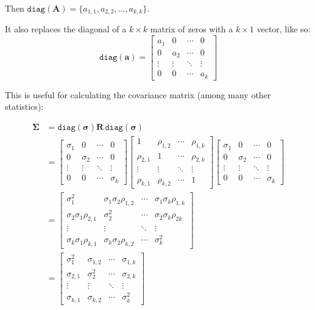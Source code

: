 \documentclass[nohyper,justified,marginals=raggedright]{tufte-book}\usepackage[]{graphicx}\usepackage[]{color}
\newcommand{\bs}[1]{\boldsymbol{#1}}
\begin{document}
\noindent Then $\mathtt{diag}(\bs{A}) = \{a_{1,1},a_{2,2},...,a_{k,k}\}$.

\noindent It also replaces the diagonal of a $k \times k$ matrix of zeros with a $k \times 1$ vector, like so:
\[
\mathtt{diag}(\bs{a}) = 
\begin{bmatrix}
  a_{1} & 0 & \cdots & 0 \\
  0 & a_{2} & \cdots & 0 \\
  \vdots  & \vdots  & \ddots & \vdots  \\
  0 & 0 & \cdots & a_{k}
 \end{bmatrix}
\]

\noindent This is useful for calculating the covariance matrix (among many other statistics):

\begin{align*}
\bs{\Sigma}&=\mathtt{diag}(\bs{\sigma}) \bs{R}\, \mathtt{diag}(\bs{\sigma})\\ 
&=\begin{bmatrix}
  \sigma_{1} & 0 & \cdots & 0 \\
  0 & \sigma_{2} & \cdots & 0 \\
  \vdots  & \vdots  & \ddots & \vdots  \\
  0 & 0 & \cdots & \sigma_{k}
 \end{bmatrix}
  \begin{bmatrix}
  1 & \rho_{1,2} & \cdots & \rho_{1,k} \\
  \rho_{2,1} & 1 & \cdots & \rho_{2,k} \\
  \vdots  & \vdots  & \ddots & \vdots  \\
  \rho_{k,1} & \rho_{k,2} & \cdots & 1
 \end{bmatrix}
\begin{bmatrix}
  \sigma_{1} & 0 & \cdots & 0 \\
  0 & \sigma_{2} & \cdots & 0 \\
  \vdots  & \vdots  & \ddots & \vdots  \\
  0 & 0 & \cdots & \sigma_{k}
 \end{bmatrix}\\
  &=  \begin{bmatrix}
  \sigma_{1}^2 & \sigma_{1}\sigma_{2}\rho_{1,2} & \cdots & \sigma_{1}\sigma_{k}\rho_{1,k} \\
  \sigma_{2}\sigma_{1}\rho_{2,1} & \sigma_{2}^2 & \cdots & \sigma_{2}\sigma_{k}\rho_{2 k} \\
  \vdots  & \vdots  & \ddots & \vdots  \\
  \sigma_{k}\sigma_{1}\rho_{k,1} & \sigma_{k}\sigma_{2}\rho_{k,2} & \cdots & \sigma_{k}^2
 \end{bmatrix}\\
   &=  \begin{bmatrix}
  \sigma_{1}^2 & \sigma_{1,2} & \cdots & \sigma_{1,k} \\
  \sigma_{2,1} & \sigma_{2}^2 & \cdots & \sigma_{2,k} \\
  \vdots  & \vdots  & \ddots & \vdots  \\
  \sigma_{k,1} & \sigma_{k,2} & \cdots & \sigma_{k}^2
 \end{bmatrix}
\end{align*}
\end{document}
